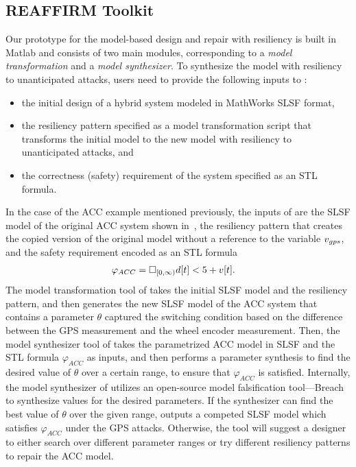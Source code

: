 \subsection{REAFFIRM Toolkit}
%
Our \toolreaffirm prototype for the model-based design and repair with resiliency is built in Matlab and consists of two main modules, corresponding to a \emph{model transformation} and a \emph{model synthesizer}. To synthesize the model with resiliency to unanticipated attacks, users need to provide the following inputs to \toolreaffirm:
%
\begin{itemize}[leftmargin= 2 em]
    \item the initial design of a hybrid system modeled in MathWorks SLSF format,
		\item the resiliency pattern specified as a model transformation script that transforms the initial model to the new model with resiliency to unanticipated attacks, and
		\item the correctness (safety) requirement of the system specified as an STL formula.
%
\end{itemize}

In the case of the ACC example mentioned previously, the inputs of \toolreaffirm are the SLSF model of the original ACC system shown in~, the resiliency pattern that creates the copied version of the original model without a reference to the variable $v_{gps}$, and the safety requirement encoded as an STL formula 
\begin{align}
\vspace{-1em}
\varphi_{ACC} &= \Box_{[0, \infty)} d[t] < 5 + v[t]. 
\vspace{-1em}
\end{align}
%
The model transformation tool of \toolreaffirm takes the initial SLSF model and the resiliency pattern, and then generates the new SLSF model of the ACC system that contains a parameter $\theta$ captured the switching condition based on the difference between the GPS measurement and the wheel encoder measurement.
%
%
Then, the model synthesizer tool of \toolreaffirm takes the parametrized ACC model in SLSF and the STL formula $\varphi_{ACC}$ as inputs, and then performs a parameter synthesis to find the desired value of $\theta$ over a certain range, to ensure that $\varphi_{ACC}$ is satisfied. Internally, the model synthesizer of \toolreaffirm utilizes an open-source model falsification tool---Breach~\cite{donze2010breach} to synthesize values for the desired parameters. If the synthesizer can find the best value of $\theta$ over the given range, \toolreaffirm outputs a competed SLSF model which satisfies $\varphi_{ACC}$ under the GPS attacks. Otherwise, the tool will suggest a designer to either search over different parameter ranges or try different resiliency patterns to repair the ACC model.   
%

